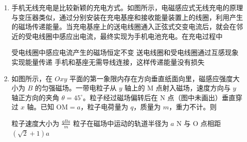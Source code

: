 \documentclass[\gkver]{gaokaozhenti}
\begin{document}
\begin{enumerate}
{D．温度是分子平均动能的标志，由于温度不变，分子的平均动能不变，D 错误。

故选 B。
}

\item
手机无线充电是比较新颖的充电方式。如图所示，电磁感应式无线充电的原理与变压器类似，通过分别安装在充电基座和接收能量装置上的线圈，利用产生的磁场传递能量。当充电基座上的送电线圈通入正弦式交变电流后，就会在邻近的受电线圈中感应出电流，最终实现为手机电池充电。在充电过程中

\onepicture[w=9.00cm, align=right]{}

{受电线圈中感应电流产生的磁场恒定不变}
{送电线圈和受电线圈通过互感现象实现能量传递}
{手机和基座无需导线连接，这样传递能量没有损失}

\item
如图所示，在 $Oxy$ 平面的第一象限内存在方向垂直纸面向里，磁感应强度大小为 $B$ 的匀强磁场。一带电粒子从 $y$ 轴上的 M 点射入磁场，速度方向与 $y$ 轴正方向的夹角 $\theta=45^{\circ}$。粒子经过磁场偏转后在 N 点（图中未画出）垂直穿过 $x$ 轴。已知 OM$=a$，粒子电荷量为 $q$，质量为 $m$，重力不计。则


{粒子速度大小为 $\frac{qBa}{m}$}
{粒子在磁场中运动的轨道半径为 $a$}
{N 与 O 点相距 $(\sqrt{2}+1)a$}
\end{enumerate}
\end{document}
